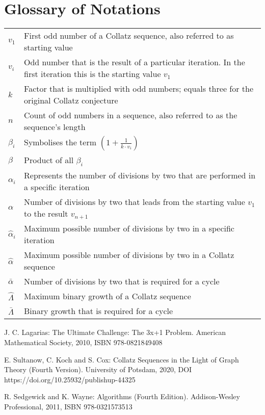 \documentclass{SciPress_2015}
\begin{document}
\section{Glossary of Notations}
\label{appx:glossary_of_notations}
\vspace{-1em}
\begin{table}[H]
	\centering
	\setlength{\tabcolsep}{1,2em}\setlength\extrarowheight{3pt}
	\begin{tabular}{|l|p{13.5cm}|}
		\hline
		\thead{\textbf{Notation}} &
		\thead{\textbf{Description}}\\
		\hline
		$v_1$ &
		First odd number of a Collatz sequence, also referred to as starting value\\
		\hline
		$v_i$ &
		Odd number that is the result of a particular iteration. In the first iteration this is the starting value $v_1$\\
		\hline
		$k$ &
		Factor that is multiplied with odd numbers; equals three for the original Collatz conjecture\\
		\hline
		$n$ &
		Count of odd numbers in a sequence, also referred to as the sequence's length\\
		\hline
		$\beta_i$ &
		Symbolises the term $\left(1+\frac{1}{k\cdot v_i}\right)$\\
		\hline
		$\beta$ &
		Product of all $\beta_i$\\
		\hline
		$\alpha_i$ &
		Represents the number of divisions by two that are performed in a specific iteration\\
		\hline
		$\alpha$ &
		Number of divisions by two that leads from the starting value $v_1$  to the result $v_{n+1}$\\
		\hline
		$\hat\alpha_i$ &
		Maximum possible number of divisions by two in a specific iteration\\
		\hline
		$\hat\alpha$ &
		Maximum possible number of divisions by two in a Collatz sequence\\
		\hline
		$\bar\alpha$ &
		Number of divisions by two that is required for a cycle\\
		\hline
		$\hat\Lambda$ &
		Maximum binary growth of a Collatz sequence\\
		\hline
		$\bar\Lambda$ &
		Binary growth that is required for a cycle\\
		\hline
	\end{tabular}
\end{table}


\newpage
\begin{thebibliography}{99}

J. C. Lagarias: The Ultimate Challenge: The 3x+1 Problem. American Mathematical Society, 2010, ISBN 978-0821849408

E. Sultanow, C. Koch and S. Cox: Collatz Sequences in the Light of Graph Theory (Fourth Version). University of Potsdam, 2020, DOI https://doi.org/10.25932/publishup-44325

R. Sedgewick and K. Wayne: Algorithms (Fourth Edition). Addison-Wesley Professional, 2011, ISBN 978-0321573513

\end{thebibliography}
\end{document}
